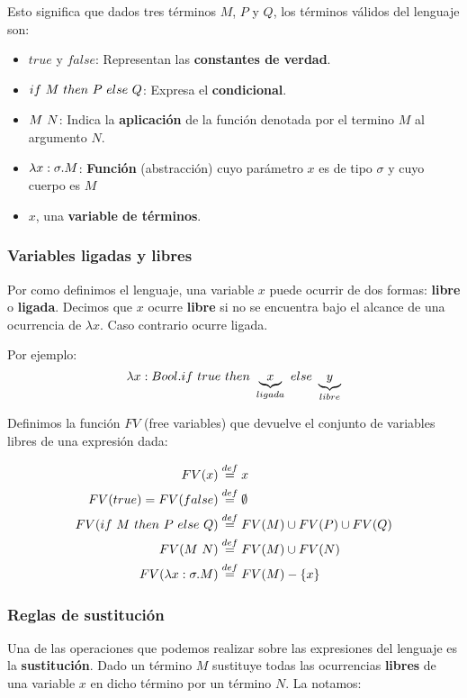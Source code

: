 Esto significa que dados tres términos $M$, $P$ y $Q$, los términos válidos del lenguaje son:
\begin{itemize}
	\item $true$ y $false$: Representan las \textbf{constantes de verdad}.
	\item $ if~ M~ then~ P~ else~ Q$: Expresa el \textbf{condicional}.
	\item $M~N$: Indica la \textbf{aplicación} de la función denotada por el termino $M$ al argumento $N$.
	\item $\lambda x: \sigma . M$: \textbf{Función} (abstracción) cuyo parámetro $x$ es de tipo $\sigma$ y cuyo cuerpo es $M$
	\item $x$, una \textbf{variable de términos}.
\end{itemize}

\subsubsection{Variables ligadas y libres}
Por como definimos el lenguaje, una variable $x$ puede ocurrir de dos formas: \textbf{libre} o \textbf{ligada}. Decimos que $x$ ocurre \textbf{libre} si no se encuentra bajo el alcance de una ocurrencia de $\lambda x$. Caso contrario ocurre ligada.

Por ejemplo:
$$\lambda x: Bool . if~ true~ then~ \underbrace{x}_{ligada}~ else~ \underbrace{y}_{libre} $$

Definimos la función $FV$ (free variables) que devuelve el conjunto de variables libres de una expresión dada:

\begin{equation*}
	\begin{split}
		FV(x) &\overset{def}{=} {x} \\
		FV(true) = FV(false) &\overset{def}{=} \emptyset \\
		FV(if~ M~ then~ P~ else~ Q) &\overset{def}{=} FV(M)\cup FV(P)\cup FV(Q) \\
		FV(M~N) &\overset{def}{=} FV(M)\cup FV(N) \\
		FV(\lambda x: \sigma . M) &\overset{def}{=} FV(M) - \{x\}
	\end{split}
\end{equation*}

\subsubsection{Reglas de sustitución}

Una de las operaciones que podemos realizar sobre las expresiones del lenguaje es la \textbf{sustitución}. Dado un término $M$ sustituye todas las ocurrencias \textbf{libres} de una variable $x$ en dicho término por un término $N$. La notamos:

